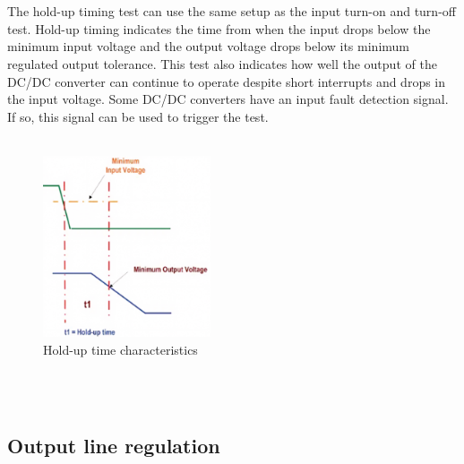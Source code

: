\\ \\	
The hold-up timing test can use the same setup as the input turn-on and turn-off test. Hold-up timing indicates the time from when the input drops below the minimum input voltage and the output voltage drops below its minimum regulated output tolerance. This test also indicates how well the output of the DC/DC converter can continue to operate despite short interrupts and drops in the input voltage. Some DC/DC converters have an input fault detection signal. If so, this signal can be used to trigger the test.
\\ \\
\begin{figure}[h]
	\centering
	\includegraphics[width=140pt]{IMGS/HoldUpTimeTest.jpg}
	\caption{Hold-up time characteristics}
	\label{fig:arch}
\end{figure} 
\\ \\
\subsection{Output line regulation}

